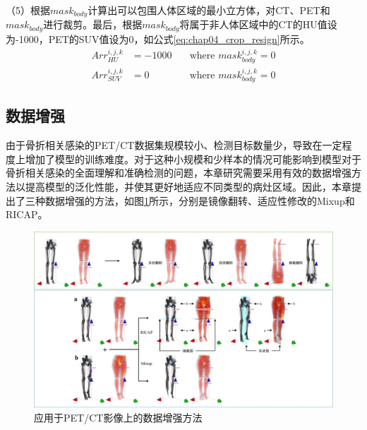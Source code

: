 （5）根据\(mask_{body}\)计算出可以包围人体区域的最小立方体，对CT、PET和\(mask_{body}\)进行裁剪。最后，根据\(mask_{body}\)将属于非人体区域中的CT的HU值设为-1000，PET的SUV值设为0，如公式\ref{eq:chap04_crop_resign}所示。
\begin{equation}
  \begin{aligned}
    Arr_{HU}^{i, j, k}  & = -1000 \quad & \text{where \(mask_{body}^{i,j,k} = 0\)} \\
    Arr_{SUV}^{i, j, k} & = 0 \quad     & \text{where \(mask_{body}^{i,j,k} = 0\)}
  \end{aligned}
  \label{eq:chap04_crop_resign}
\end{equation}

\subsection{数据增强}

由于骨折相关感染的PET/CT数据集规模较小、检测目标数量少，导致在一定程度上增加了模型的训练难度。对于这种小规模和少样本的情况可能影响到模型对于骨折相关感染的全面理解和准确检测的问题，本章研究需要采用有效的数据增强方法以提高模型的泛化性能，并使其更好地适应不同类型的病灶区域。因此，本章提出了三种数据增强的方法，如图\ref{fig:chap04_augmentation}所示，分别是镜像翻转、适应性修改的Mixup和RICAP。

\begin{figure}
  \centering
  \includegraphics[height=\textwidth, width=0.95\textheight,angle=90,keepaspectratio]{figures/chap04_augmentation.jpg}
  \caption{应用于PET/CT影像上的数据增强方法}
  \label{fig:chap04_augmentation}
\end{figure}

